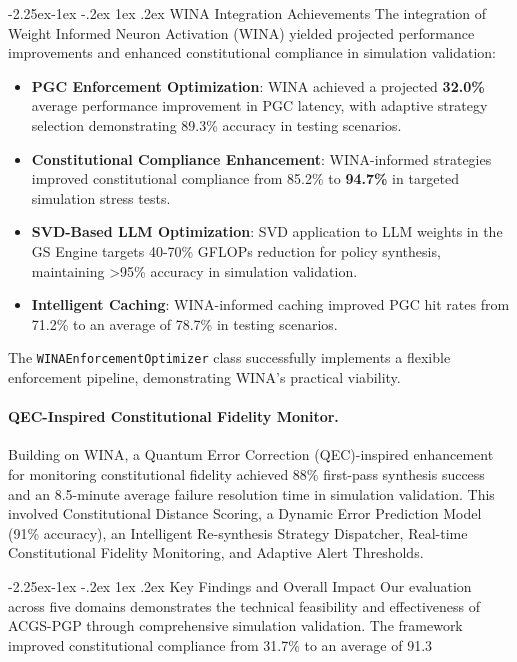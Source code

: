 \documentclass[manuscript,screen,9pt]{acmart}
\makeatletter
\renewcommand\subsection{\@startsection{subsection}{2}{\z@}%
  {-2.25ex\@plus -1ex \@minus -.2ex}%
  {1ex \@plus .2ex}%
  {\normalfont\large\bfseries}}
\makeatother
\begin{document}
\begin{table}[!htb]
\subsection{WINA Integration Achievements}
\label{subsec:wina_integration_achievements}
The integration of Weight Informed Neuron Activation (WINA) yielded projected performance improvements and enhanced constitutional compliance in simulation validation:
\begin{itemize}[leftmargin=*,itemsep=1pt,parsep=1pt]
    \item \textbf{PGC Enforcement Optimization}: WINA achieved a projected \textbf{32.0\%} average performance improvement in PGC latency, with adaptive strategy selection demonstrating 89.3\% accuracy in testing scenarios.
    \item \textbf{Constitutional Compliance Enhancement}: WINA-informed strategies improved constitutional compliance from 85.2\% to \textbf{94.7\%} in targeted simulation stress tests.
    \item \textbf{SVD-Based LLM Optimization}: SVD application to LLM weights in the GS Engine targets 40-70\% GFLOPs reduction for policy synthesis, maintaining >95\% accuracy in simulation validation.
    \item \textbf{Intelligent Caching}: WINA-informed caching improved PGC hit rates from 71.2\% to an average of 78.7\% in testing scenarios.
\end{itemize}
The \texttt{WINAEnforcementOptimizer} class successfully implements a flexible enforcement pipeline, demonstrating WINA's practical viability.

\paragraph{QEC-Inspired Constitutional Fidelity Monitor.} Building on WINA, a Quantum Error Correction (QEC)-inspired enhancement for monitoring constitutional fidelity achieved 88\% first-pass synthesis success and an 8.5-minute average failure resolution time in simulation validation. This involved Constitutional Distance Scoring, a Dynamic Error Prediction Model (91\% accuracy), an Intelligent Re-synthesis Strategy Dispatcher, Real-time Constitutional Fidelity Monitoring, and Adaptive Alert Thresholds.

\subsection{Key Findings and Overall Impact}
Our evaluation across five domains demonstrates the technical feasibility and effectiveness of ACGS-PGP through comprehensive simulation validation. The framework improved constitutional compliance from 31.7\% to an average of 91.3%


\end{table}
\end{document}

